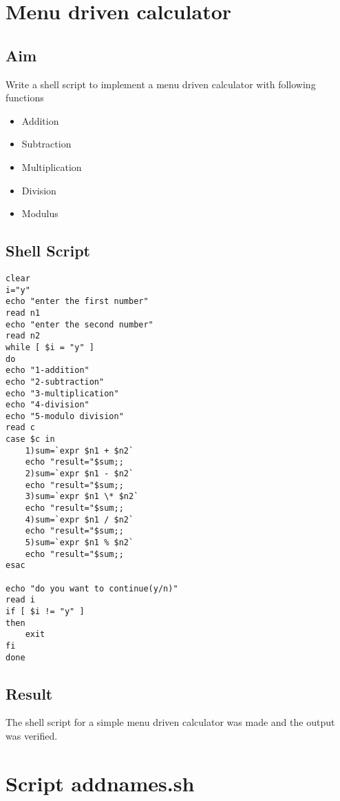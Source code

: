 \documentclass{article}
\begin{document}
\newpage

\section{Menu driven calculator}
\subsection{Aim}
Write a shell script to implement a menu driven calculator with following functions
\begin{itemize}

\item Addition
\item Subtraction
\item Multiplication
\item Division
\item Modulus

\end{itemize}

\subsection{Shell Script}

\begin{verbatim}
clear 
i="y"
echo "enter the first number"
read n1
echo "enter the second number"
read n2
while [ $i = "y" ]
do
echo "1-addition"
echo "2-subtraction"
echo "3-multiplication"
echo "4-division"
echo "5-modulo division"
read c
case $c in 
	1)sum=`expr $n1 + $n2`
	echo "result="$sum;;
	2)sum=`expr $n1 - $n2`
    echo "result="$sum;;
	3)sum=`expr $n1 \* $n2`
    echo "result="$sum;;
	4)sum=`expr $n1 / $n2`
    echo "result="$sum;;
    5)sum=`expr $n1 % $n2`
    echo "result="$sum;;
esac

echo "do you want to continue(y/n)"
read i
if [ $i != "y" ]
then 
	exit
fi
done
\end{verbatim}

\subsection{Result}
The shell script for a simple menu driven calculator was made and the output was verified.
\newpage

\section{Script addnames.sh}
\end{document}
